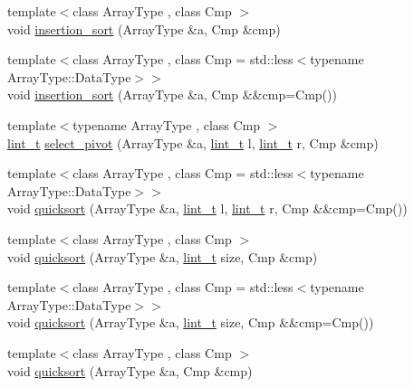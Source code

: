 \begin{DoxyCompactItemize}
\item 
{\footnotesize template$<$class Array\+Type , class Cmp $>$ }\\void \hyperlink{namespace_designar_ab78e23e3c8eb0365e27244f5de2532d2}{insertion\+\_\+sort} (Array\+Type \&a, Cmp \&cmp)
\item 
{\footnotesize template$<$class Array\+Type , class Cmp  = std\+::less$<$typename Array\+Type\+::\+Data\+Type$>$$>$ }\\void \hyperlink{namespace_designar_a93966614af4a5a6c0bd78fe75af5e7cf}{insertion\+\_\+sort} (Array\+Type \&a, Cmp \&\&cmp=Cmp())
\item 
{\footnotesize template$<$typename Array\+Type , class Cmp $>$ }\\\hyperlink{namespace_designar_a9d113d66a39e82b73727c72cd3a52f73}{lint\+\_\+t} \hyperlink{namespace_designar_ac3674dae50d8d382e25a5fce8775294c}{select\+\_\+pivot} (Array\+Type \&a, \hyperlink{namespace_designar_a9d113d66a39e82b73727c72cd3a52f73}{lint\+\_\+t} l, \hyperlink{namespace_designar_a9d113d66a39e82b73727c72cd3a52f73}{lint\+\_\+t} r, Cmp \&cmp)
\item 
{\footnotesize template$<$class Array\+Type , class Cmp  = std\+::less$<$typename Array\+Type\+::\+Data\+Type$>$$>$ }\\void \hyperlink{namespace_designar_af359499060a9d2b8e282ae9def049e17}{quicksort} (Array\+Type \&a, \hyperlink{namespace_designar_a9d113d66a39e82b73727c72cd3a52f73}{lint\+\_\+t} l, \hyperlink{namespace_designar_a9d113d66a39e82b73727c72cd3a52f73}{lint\+\_\+t} r, Cmp \&\&cmp=Cmp())
\item 
{\footnotesize template$<$class Array\+Type , class Cmp $>$ }\\void \hyperlink{namespace_designar_a4887d9486cdfcd7e021047915ae26651}{quicksort} (Array\+Type \&a, \hyperlink{namespace_designar_a9d113d66a39e82b73727c72cd3a52f73}{lint\+\_\+t} size, Cmp \&cmp)
\item 
{\footnotesize template$<$class Array\+Type , class Cmp  = std\+::less$<$typename Array\+Type\+::\+Data\+Type$>$$>$ }\\void \hyperlink{namespace_designar_a3b84da2b14868b20993ec9687e3c29c4}{quicksort} (Array\+Type \&a, \hyperlink{namespace_designar_a9d113d66a39e82b73727c72cd3a52f73}{lint\+\_\+t} size, Cmp \&\&cmp=Cmp())
\item 
{\footnotesize template$<$class Array\+Type , class Cmp $>$ }\\void \hyperlink{namespace_designar_ae6156420cc82f38302cc7b7c837275b1}{quicksort} (Array\+Type \&a, Cmp \&cmp)

\end{DoxyCompactItemize}
